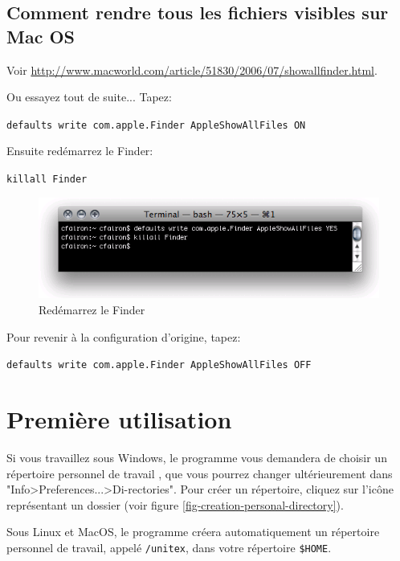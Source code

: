 

\subsection{Comment rendre tous les fichiers visibles sur Mac OS}
\noindent Voir
\url{http://www.macworld.com/article/51830/2006/07/showallfinder.html}.

\bigskip
\noindent Ou essayez tout de suite... Tapez: 

\bigskip
\verb+defaults write com.apple.Finder AppleShowAllFiles ON+

\bigskip
\noindent Ensuite redémarrez le Finder:

\bigskip
\verb+killall Finder+

\begin{figure}[!h]
\begin{center}
\includegraphics[width=12cm]{resources/img/fig-mac6.png}
\caption{Redémarrez le Finder\label{fig-mac6}}
\end{center}
\end{figure}

\bigskip
\noindent Pour revenir à la configuration d'origine, tapez: 

\bigskip
\verb+defaults write com.apple.Finder AppleShowAllFiles OFF+


\section{Première utilisation}
Si vous travaillez sous Windows, le programme vous demandera de choisir un répertoire personnel de travail
, que vous pourrez changer ultérieurement dans
"Info>Preferences...>Di-rectories". Pour créer un répertoire, cliquez sur l’icône représentant un
dossier (voir figure \ref{fig-creation-personal-directory}).

\bigskip
\noindent Sous Linux et MacOS, le programme créera automatiquement un répertoire personnel de travail,
appelé \verb+/unitex+, dans votre répertoire \verb+$HOME+. 

